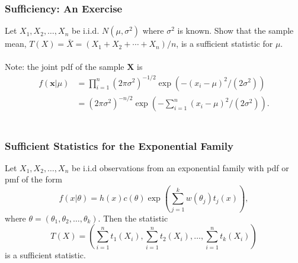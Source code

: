 \documentclass{beamer}
\begin{document}
\begin{frame}
\frametitle{Sufficiency: An Exercise}
Let $X_1,X_2,\ldots,X_n$ be i.i.d. $N(\mu,\sigma^2)$ where $\sigma^2$ is known. Show that the sample mean, $T(X) = \bar{X} = (X_1+X_2+\cdots+X_n)/n$, is a sufficient statistic for $\mu$.
\\~\\
Note: the joint pdf of the sample $\mathbf{X}$ is
$$
\begin{aligned}
f(\mathbf{x}|\mu) &= \prod_{i=1}^n (2\pi \sigma^2)^{-1/2} \exp(-(x_i - \mu)^2/(2\sigma^2))\\
&=(2\pi \sigma^2)^{-n/2} \exp(-\sum_{i=1}^n(x_i - \mu)^2/(2\sigma^2)).
\end{aligned}
$$
~\\
\end{frame}


\begin{frame}
\frametitle{Sufficient Statistics for the Exponential Family}
Let $X_1,X_2,\ldots,X_n$ be i.i.d observations from an exponential family with pdf or pmf of the form
$$
f(x|\theta) = h(x)c(\theta)\exp\left(\sum_{j=1}^k w(\theta_j)t_j(x)\right),
$$
where $\theta = (\theta_1,\theta_2,\ldots,\theta_k)$. Then the statistic
$$
T(X) = \left(\sum_{i=1}^n t_1(X_i),\sum_{i=1}^n t_2(X_i),\ldots,\sum_{i=1}^n t_k(X_i)\right)
$$
is a sufficient statistic.
\end{frame}
\end{document}
